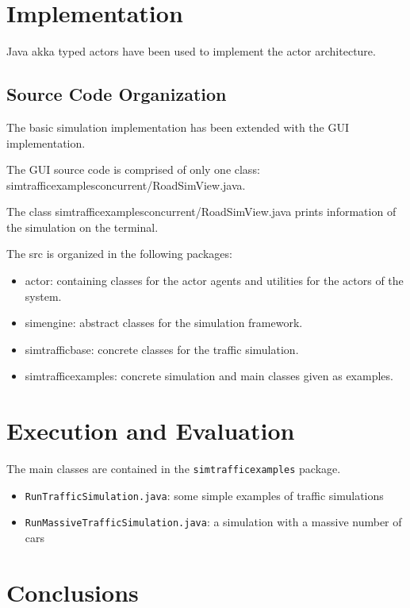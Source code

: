 \documentclass[12pt, a4paper]{report}
\begin{document}
\newpage

\chapter{Implementation}

Java akka typed actors have been used to implement the actor architecture.

\section{Source Code Organization}
The basic simulation implementation has been extended with the GUI implementation.

The GUI source code is comprised of only one class: simtrafficexamplesconcurrent/RoadSimView.java.

The class simtrafficexamplesconcurrent/RoadSimView.java prints information of the simulation on the terminal.

The src is organized in the following packages:
\begin{itemize}
    \item actor: containing classes for the actor agents and utilities for the actors of the system.
    \item simengine: abstract classes for the simulation framework.
    \item simtrafficbase: concrete classes for the traffic simulation.
    \item simtrafficexamples: concrete simulation and main classes given as examples.
\end{itemize}

\chapter{Execution and Evaluation}

The main classes are contained in the \texttt{simtrafficexamples} package.

\begin{itemize}
    \item \texttt{RunTrafficSimulation.java}: some simple examples of traffic simulations
    \item \texttt{RunMassiveTrafficSimulation.java}: a simulation with a massive number of cars
\end{itemize}

\chapter{Conclusions}
\end{document}
